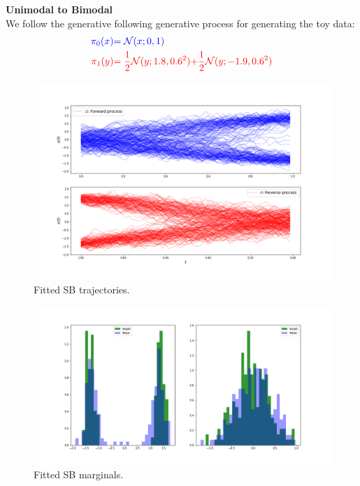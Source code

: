 \documentclass[a4paper,12pt,twoside,openright]{report}
\theoremstyle{definition}
\begin{document}
\textbf{Unimodal to Bimodal}\\

We follow the generative following generative process for generating the toy data:
\begin{align*}
     \color{blue}{\pi_0(x)} &\color{blue}{= {\mathcal{N}}(x; 0,  1)} \\
    \color{red}{\pi_1(y)} &\color{red}{= \frac{1}{2}{\mathcal{N}}(y; 1.8, 0.6 ^2)}\color{red}{ + \frac{1}{2}{\mathcal{N}}(y; -1.9, 0.6 ^2) }
\end{align*}
\begin{figure}
    \centering
    \includegraphics[scale=0.4,trim={2.3cm 1cm 2.5cm 0}, clip]{images/GP/gp_final_bimodal_trajectories.png}
    \caption{ Fitted SB trajectories.  }
    \label{fig:bimodfinal200trajectroies}
\end{figure}
\begin{figure}
    \centering
    \includegraphics[scale=0.3,trim={4cm 1cm 2.5cm 0}, clip]{images/GP/gp_2_mode_final_boundaires.png}
    \caption{ Fitted SB marginals.  }
    \label{fig:bimodfinal200boundaries}
\end{figure}
\end{document}
